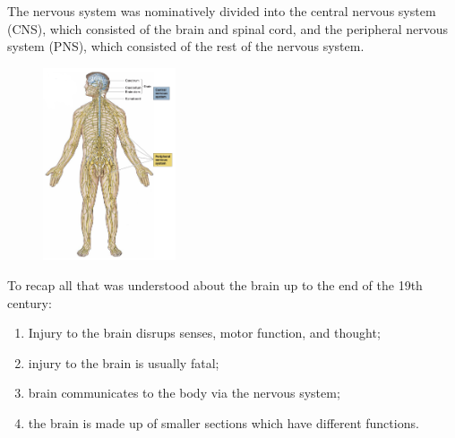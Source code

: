 The nervous system was nominatively divided into the central nervous system (CNS), which consisted of the brain and spinal cord, and the peripheral nervous system (PNS), which consisted of the rest of the nervous system.

\begin{figure}[H]
  \begin{center}
    \includegraphics[width=0.35\textwidth]{figures/nerves}
  \end{center}
  \caption{}\label{fig:}
\end{figure}

\pagebreak

To recap all that was understood about the brain up to the end of the 19th century:
\begin{enumerate}
  \item Injury to the brain disrups senses, motor function, and thought;
    
  \item injury to the brain is usually fatal;
  
  \item brain communicates to the body via the nervous system;
  
  \item the brain is made up of smaller sections which have different functions.
\end{enumerate}



